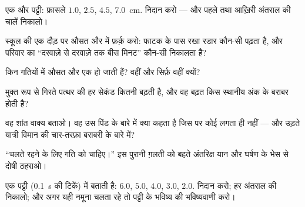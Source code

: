 \begin{exercise}[$\star$]\label{exo:g9:uniform-varied-motion:3}
एक और पट्टी: फ़ासले $1.0$, $2.5$, $4.5$, \qty{7.0}{cm}. निदान करो ---
और पहले तथा आख़िरी अंतराल की चालें निकालो।
\end{exercise}

\begin{exercise}[$\star$]\label{exo:g9:uniform-varied-motion:4}
स्कूल की एक दौड़ पर औसत और  में फ़र्क़ करो: फाटक के पास
रखा रडार कौन-सी पढ़ता है, और परिवार का ``दरवाज़े से दरवाज़े तक बीस
मिनट'' कौन-सी निकालता है?
\end{exercise}

\begin{exercise}[$\star$]\label{exo:g9:uniform-varied-motion:5}
किन गतियों में औसत और  एक हो जाती हैं? वहीं और सिर्फ़
वहीं क्यों?
\end{exercise}

\begin{exercise}[$\star$]\label{exo:g9:uniform-varied-motion:6}
मुक्त रूप से गिरते पत्थर की  हर सेकंड कितनी बढ़ती है, और वह बढ़त
किस स्थानीय अंक के बराबर होती है?
\end{exercise}

\begin{exercise}[$\star$]\label{exo:g9:uniform-varied-motion:7}
वह शांत वाक्य बताओ। वह उस पिंड के बारे में क्या कहता है जिस पर कोई 
लगता ही नहीं --- और उड़ते यात्री विमान की चार-तरफ़ा बराबरी के बारे में?
\end{exercise}

\begin{exercise}[$\star$]\label{exo:g9:uniform-varied-motion:8}
``चलते रहने के लिए गति को  चाहिए।'' इस पुरानी ग़लती को बहते
अंतरिक्ष यान और घर्षण के भेस से दोषी ठहराओ।
\end{exercise}

\begin{exercise}[$\star\star$]\label{exo:g9:uniform-varied-motion:9}
एक पट्टी (\qty{0.1}{s} की टिकें)  में बताती है: $6.0$,
$5.0$, $4.0$, $3.0$, $2.0$. निदान करो; हर अंतराल की  निकालो; और
अगर यही नमूना चलता रहे तो पट्टी के भविष्य की भविष्यवाणी करो।
\end{exercise}

